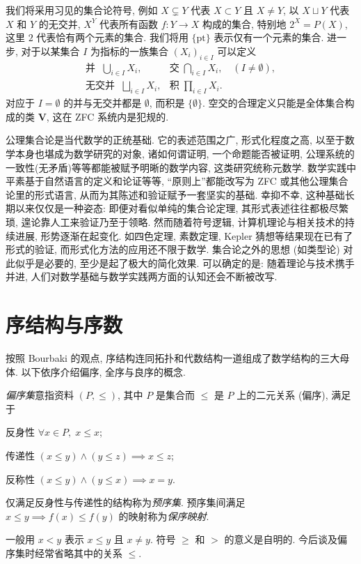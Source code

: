 我们将采用习见的集合论符号, 例如 $X \subsetneq Y$ 代表 $X \subset Y$ 且 $X \neq Y$, 以 $X \sqcup Y$ 代表 $X$ 和 $Y$ 的无交并, $X^Y$ 代表所有函数 $f: Y \to X$ 构成的集合, 特别地 $2^X = P(X)$, 这里 $2$ 代表恰有两个元素的集合. 我们将用 $\{\text{pt}\}$ 表示仅有一个元素的集合. 进一步, 对于以某集合 $I$ 为指标的一族集合 $(X_i)_{i \in I}$ 可以定义
\[ \begin{array}{ll}
	\text{并 } \; \bigcup_{i \in I} X_i, & \text{交} \; \bigcap_{i \in I} X_i, \quad (I \neq \emptyset), \\
	\text{无交并 } \; \bigsqcup_{i \in I} X_i, & \text{积} \; \prod_{i \in I} X_i.
\end{array}\]
对应于 $I=\emptyset$ 的并与无交并都是 $\emptyset$, 而积是 $\{\emptyset\}$. 空交的合理定义只能是全体集合构成的类 $\textbf{V}$, 这在 ZFC 系统内是犯规的.

公理集合论是当代数学的正统基础. 它的表述范围之广, 形式化程度之高, 以至于数学本身也堪成为数学研究的对象, 诸如何谓证明, 一个命题能否被证明, 公理系统的一致性(无矛盾)等等都能被赋予明晰的数学内容, 这类研究统称元数学. 数学实践中平素基于自然语言的定义和论证等等, ``原则上''都能改写为 ZFC 或其他公理集合论里的形式语言, 从而为其陈述和验证赋予一套坚实的基础. 幸抑不幸, 这种基础长期以来仅仅是一种姿态: 即便对看似单纯的集合论定理, 其形式表述往往都极尽繁琐, 遑论靠人工来验证乃至于领略. 然而随着符号逻辑, 计算机理论与相关技术的持续进展, 形势逐渐在起变化. 如四色定理, 素数定理, Kepler 猜想等结果现在已有了形式的验证, 而形式化方法的应用还不限于数学. 集合论之外的思想 (如类型论) 对此似乎是必要的, 至少是起了极大的简化效果. 可以确定的是: 随着理论与技术携手并进, 人们对数学基础与数学实践两方面的认知还会不断被改写.

\section{序结构与序数}\label{sec:order}
按照 Bourbaki 的观点, 序结构连同拓扑和代数结构一道组成了数学结构的三大母体. 以下依序介绍偏序, 全序与良序的概念.

\begin{definition}\label{def:partial-order}
	\emph{偏序集}意指资料 $(P, \leq)$, 其中 $P$ 是集合而 $\leq$ 是 $P$ 上的二元关系 (偏序), 满足于
	\begin{compactdesc}
		\item[反身性] $\forall x \in P, \; x \leq x$;
		\item[传递性] $(x \leq y) \wedge (y \leq z) \implies x \leq z$;
		\item[反称性] $(x \leq y) \wedge (y \leq x) \implies x=y$.
	\end{compactdesc}
	仅满足反身性与传递性的结构称为\emph{预序集}. 预序集间满足 $x \leq y \implies f(x) \leq f(y)$ 的映射称为\emph{保序映射}.

	一般用 $x < y$ 表示 $x \leq y$ 且 $x \neq y$. 符号 $\geq$ 和 $>$ 的意义是自明的. 今后谈及偏序集时经常省略其中的关系 $\leq$.
\end{definition}

